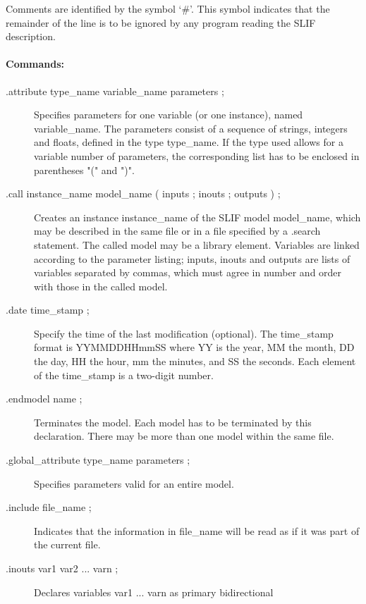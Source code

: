 {\begin{pespace}
     Comments are identified by the symbol `\#'.  This symbol
     indicates that the remainder of the line is to be ignored by
     any program reading the SLIF description.

\paragraph{Commands:}
\begin{description}
\item     [.attribute type\_name variable\_name parameters ;]
          Specifies parameters for one variable (or one
          instance), named variable\_name. The parameters consist
          of a sequence of strings, integers and floats, defined
          in the type type\_name. If the type used allows for a
          variable number of parameters, the corresponding list
          has to be enclosed in parentheses "(" and ")".
\item     [.call instance\_name model\_name ( inputs ; inouts ; outputs ) ;]
          Creates an instance instance\_name of the SLIF model
          model\_name, which may be described in the same file or
          in a file specified by a .search statement.  The called
          model may be a library element.  Variables are linked
          according to the parameter listing; inputs, inouts and
          outputs are lists of variables separated by commas,
          which must agree in number and order with those in the
          called model.
\item     [.date time\_stamp ;]
          Specify the time of the last modification (optional).
          The time\_stamp format is YYMMDDHHmmSS where YY is the
          year, MM the month, DD the day, HH the hour, mm the
          minutes, and SS the seconds. Each element of the
          time\_stamp is a two-digit number.
\item     [.endmodel name ;]
          Terminates the model. Each model has to be terminated
          by this declaration. There may be more than one model
          within the same file.
\item     [.global\_attribute type\_name parameters ;]
          Specifies parameters valid for an entire model.
\item     [.include file\_name ;]
          Indicates that the information in file\_name will be
          read as if it was part of the current file.
\item     [.inouts var1 var2 ... varn ;]
          Declares variables var1 ... varn as primary bidirectional

\end{description}
\end{pespace}}
